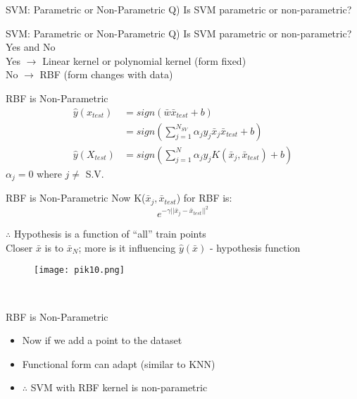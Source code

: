 \documentclass{beamer}
\begin{document}
	\begin{frame}{SVM: Parametric or Non-Parametric}
	    Q) Is SVM parametric or non-parametric? \\
	\end{frame}
	\begin{frame}{SVM: Parametric or Non-Parametric}
	    Q) Is SVM parametric or non-parametric? \\
	    \hspace{0.5cm} Yes and No \\
	    \hspace{0.5cm} Yes $\rightarrow$ Linear kernel or polynomial kernel (form fixed)\\
	    \hspace{0.5cm} No $\rightarrow$ RBF (form changes with data)
	\end{frame}
	\begin{frame}{RBF is Non-Parametric}
	    \begin{align*}
	        \hat{y}(x_{test}) &= sign(\bar{w}\bar{x}_{test} + b) \\
	        &= sign(\sum_{j=1}^{N_{SV}}\alpha_{j}y_{j}\bar{x}_{j}\bar{x}_{test} + b)\\
	        \hat{y}(X_{test}) &= sign(\sum_{j=1}^{N}\alpha_{j}y_{j} K(\bar{x}_{j}, \bar{x}_{test}) + b)
	    \end{align*}
	    $\alpha_{j} = 0$ where $j \neq$ S.V.
	\end{frame}
	\begin{frame}{RBF is Non-Parametric}
	    Now K($\bar{x}_{j}, \bar{x}_{test}$) for RBF is:
	    $$e^{-\gamma \lvert\lvert\bar{x}_{j} - \bar{x}_{test}\rvert\rvert^{2}}$$
	    
	    $\therefore$ Hypothesis is a function of ``all'' train points \\
	    Closer $\bar{x}$ is to $\bar{x}_{N}$; more is it influencing $\hat{y}(\bar{x})$ - hypothesis function
	    \vspace{-4cm}
	    \begin{minipage}{0.2\textwidth}
    \vspace{-2cm}
      \begin{figure}
      
       \texttt{[image: pik10.png]}
      \end{figure}
  \end{minipage} \\
	\end{frame}
	\begin{frame}{RBF is Non-Parametric}
		\begin{itemize}
\item Now if we add a point to the dataset 
			\item Functional form can adapt (similar to KNN) 
			\pause
\item $\therefore$ SVM with RBF kernel is non-parametric
		\end{itemize}
	\end{frame}
\end{document}
